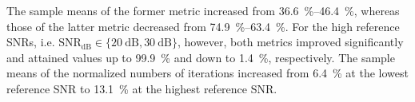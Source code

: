 The sample means of
the former metric increased from
\SIrange{36.6}{46.4}{\percent}, whereas
those of
the latter metric decreased from
\SIrange{74.9}{63.4}{\percent}.
For
the high reference \acp{SNR}, i.e.
$\text{SNR}_{\text{dB}} \in \{ \SI{20}{\deci\bel}, \SI{30}{\deci\bel} \}$, however,
both metrics improved significantly and attained
values up to
\SI{99.9}{\percent} and down to
\SI{1.4}{\percent},
respectively.
The sample means of
the normalized numbers of
iterations increased from
\SI{6.4}{\percent} at
the lowest reference \ac{SNR} to
\SI{13.1}{\percent} at
the highest reference \ac{SNR}.
